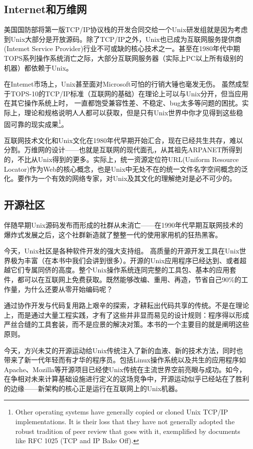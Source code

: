 \documentclass[12pt,oneside]{book}
\begin{document}
\begin{common-format}
\subsection{Internet和万维网}
美国国防部将第一版TCP/IP协议栈的开发合同交给一个Unix研发组就是因为考虑到Unix大部分是开放源码。除了TCP/IP之外，Unix也已成为互联网服务提供商(Intemet Service Provider)行业不可或缺的核心技术之一。甚至在1980年代中期TOPS系列操作系统消亡之际，大部分互联网服务器（实际上PC以上所有级别的机器）都依赖于Unix。

在Intemet市场上，Unix甚至面对Microsoft可怕的行销大锤也毫发无伤。  虽然成型于TOPS-10的TCP/IP标准（互联网的基础）在理论上可以与Unix分开，但当应用在其它操作系统上时，  一直都饱受兼容性差、不稳定、bug太多等问题的困扰。实际上，理论和规格说明人人都可以获取，但是只有Unix世界中你才见得到这些稳固可靠的现实成果\footnote{Other operating systems have generally copied or cloned Unix TCP/IP implementations. It is their loss that they have not generally adopted the robust tradition of peer review that goes with it, exemplified by documents like RFC 1025 (TCP and IP Bake Off).}。

互联网技术文化和Unix文化在1980年代早期开始汇合，现在已经共生共存，难以分割。万维网的设计——也就是互联网的现代面孔，从其祖先ARPANET所得到的，不比从Unix得到的更多。实际上，统一资源定位符URL(Uniform Resource Locator)作为Web的核心概念，也是Unix中无处不在的统一文件名字空间概念的泛化。要作为一个有效的网络专家，对Unix及其文化的理解绝对是必不可少的。

\subsection{开源社区}
伴随早期Unix源码发布而形成的社群从未消亡——在1990年代早期互联网技术的爆炸式发展之后，这个社群新造就了整整一代的使用家用机的狂热黑客。

今天，Unix社区是各种软件开发的强大支持组。  高质量的开源开发工具在Unix世界极为丰富（在本书中我们会讲到很多）。开源的Unix应用程序已经达到、或者超越它们专属同侪的高度\cite{Fuzz}。整个Unix操作系统连同完整的工具包、基本的应用套件，都可以在互联网上免费获取。既然能够改编、重用、再造，节省自己90\%的工作量，为什么还要从零开始编码呢？

通过协作开发与代码复用路上艰辛的探索，才耕耘出代码共享的传统。不是在理论上，而是通过大量工程实践，才有了这些并非显而易见的设计规则：程序得以形成严丝合缝的工具套装，而不是应景的解决对策。本书的一个主要目的就是阐明这些原则。

今天，方兴未艾的开源运动给Unix传统注入了新的血液、新的技术方法，同时也带来了新一代年轻而有才华的程序员。包括Linux操作系统以及共生的应用程序如Apache、Mozilla等开源项目已经使Unix传统在主流世界空前亮眼与成功。如今，在争相对未来计算基础设施进行定义的这场竞争中，开源运动似乎已经站在了胜利的边缘——新架构的核心正是运行在互联网上的Unix机器。


\end{common-format}
\end{document}
